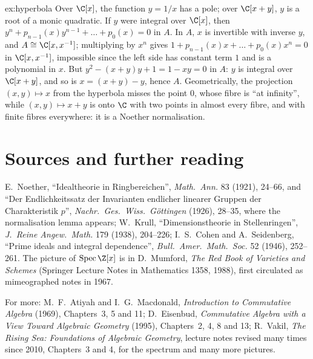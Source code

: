 \begin{solution}{ex:hyperbola}
\idea Over $\C[x]$, the function $y=1/x$ has a pole; over $\C[x+y]$, $y$ is a root of a monic quadratic.
\writeup If $y$ were integral over $\C[x]$, then $y^n+p_{n-1}(x)y^{n-1}+\dots+p_0(x)=0$ in $A$. In $A$, $x$ is invertible with inverse $y$, and $A\cong\C[x,x^{-1}]$; multiplying by $x^n$ gives $1+p_{n-1}(x)x+\dots+p_0(x)x^n=0$ in
$\C[x,x^{-1}]$, impossible since the left side has constant term $1$ and is a polynomial in $x$. But $y^2-(x+y)y+1=1-xy=0$ in $A$: $y$ is integral over $\C[x+y]$, and so is $x=(x+y)-y$, hence $A$. Geometrically, the projection
$(x,y)\mapsto x$ from the hyperbola misses the point $0$, whose fibre is ``at infinity'', while $(x,y)\mapsto x+y$ is onto $\C$ with two points in almost every fibre, and with finite fibres everywhere: it is a Noether normalisation.
\end{solution}

\section*{Sources and further reading}

E.~Noether, ``Idealtheorie in Ringbereichen'', \emph{Math.\ Ann.} 83 (1921), 24--66, and ``Der Endlichkeitssatz der Invarianten endlicher linearer Gruppen der Charakteristik $p$'', \emph{Nachr.\ Ges.\ Wiss.\ Göttingen} (1926), 28--35, where
the normalisation lemma appears; W.~Krull, ``Dimensionstheorie in Stellenringen'', \emph{J.\ Reine Angew.\ Math.} 179 (1938), 204--226; I.~S.~Cohen and A.~Seidenberg, ``Prime ideals and integral dependence'', \emph{Bull.\ Amer.\ Math.\ Soc.} 52
(1946), 252--261. The picture of $\operatorname{Spec}\Z[x]$ is in D.~Mumford, \emph{The Red Book of Varieties and Schemes} (Springer Lecture Notes in Mathematics 1358, 1988), first circulated as mimeographed notes in 1967.

For more: M.~F.~Atiyah and I.~G.~Macdonald, \emph{Introduction to Commutative Algebra} (1969), Chapters~3, 5 and 11; D.~Eisenbud, \emph{Commutative Algebra with a View Toward Algebraic Geometry} (1995), Chapters~2, 4, 8 and 13;
R.~Vakil, \emph{The Rising Sea: Foundations of Algebraic Geometry}, lecture notes revised many times since 2010, Chapters~3 and 4, for the spectrum and many more pictures.
